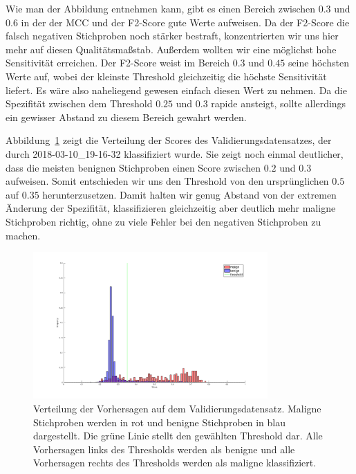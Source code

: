 Wie man der Abbildung entnehmen kann, gibt es einen Bereich zwischen $0.3$ und $0.6$ in der der MCC und der F2-Score gute Werte aufweisen. Da der F2-Score die falsch negativen Stichproben noch stärker bestraft, konzentrierten wir uns hier mehr auf diesen Qualitätsmaßstab. Außerdem wollten wir eine möglichst hohe Sensitivität erreichen. Der F2-Score weist im Bereich $0.3$ und $0.45$ seine höchsten Werte auf, wobei der kleinste Threshold gleichzeitig die höchste Sensitivität liefert. Es wäre also naheliegend gewesen einfach diesen Wert zu nehmen. Da die Spezifität zwischen dem Threshold $0.25$ und $0.3$ rapide ansteigt, sollte allerdings ein gewisser Abstand zu diesem Bereich gewahrt werden. 

Abbildung~\ref{fig:verteilung} zeigt die Verteilung der Scores des Validierungsdatensatzes, der durch 2018-03-10\_19-16-32 klassifiziert wurde. Sie zeigt noch einmal deutlicher, dass die meisten benignen Stichproben einen Score zwischen $0.2$ und $0.3$ aufweisen. Somit entschieden wir uns den Threshold von den ursprünglichen $0.5$ auf $0.35$ herunterzusetzen. Damit halten wir genug Abstand von der extremen Änderung der Spezifität, klassifizieren gleichzeitig aber deutlich mehr maligne Stichproben richtig, ohne zu viele Fehler bei den negativen Stichproben zu machen. 

\begin{figure}[htb!]
	\begin{center}
		\includegraphics[width=0.8\textwidth]{pics/threshold/score_threshold.png}
		\caption{Verteilung der Vorhersagen auf dem Validierungsdatensatz. Maligne Stichproben werden in rot und benigne Stichproben in blau dargestellt. Die grüne Linie stellt den gewählten Threshold dar. Alle Vorhersagen links des Thresholds werden als benigne und alle Vorhersagen rechts des Thresholds werden als maligne klassifiziert.}
		\label{fig:verteilung}
    \end{center}
\end{figure}



